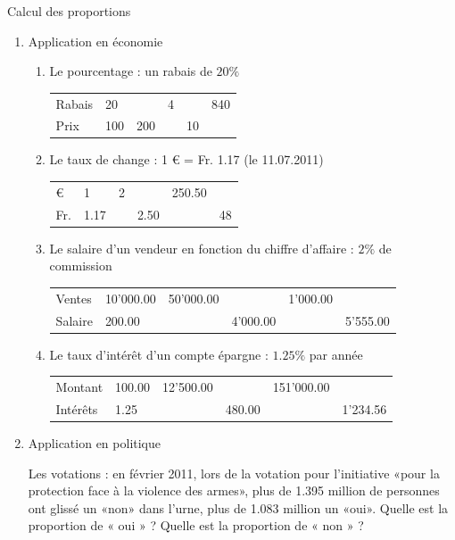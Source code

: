\begin{exercice}

Calcul des proportions
 
\begin{enumerate}
\item Application en économie
\begin{enumerate}
\item Le pourcentage : un rabais de $20 \%$

\begin{tabular}{llllll}
Rabais & 20  &     & 4 &    & 840 \\
Prix   & 100 & 200 &   & 10 &    
\end{tabular}

\item Le taux de change : 1 \euro{} = Fr. 1.17 (le 11.07.2011)

\begin{tabular}{llllll}
\euro{}   & 1    & 2 &      & 250.50 &    \\
Fr. & 1.17 &   & 2.50 &        & 48
\end{tabular}
\item Le salaire d’un vendeur en fonction du chiffre d’affaire : $2 \%$ de commission

\begin{tabular}{llllll}
Ventes  & 10'000.00 & 50'000.00 &          & 1'000.00 &          \\
Salaire & 200.00    &           & 4'000.00 &          & 5'555.00
\end{tabular}

\item Le taux d’intérêt d’un compte épargne : $1.25 \%$ par année

\begin{tabular}{llllll}
Montant  & 100.00 & 12'500.00 &        & 151'000.00 &          \\
Intérêts & 1.25   &           & 480.00 &            & 1'234.56
\end{tabular}
\end{enumerate}
 
\item Application en politique

Les votations : en février 2011, lors de la votation pour l’initiative «pour la protection face à la violence des armes», plus de 1.395 million de personnes ont glissé un «non» dans l'urne, plus de 1.083 million un «oui». 
Quelle est la proportion de « oui » ? Quelle est la proportion de « non » ?


\end{enumerate}
\end{exercice}
